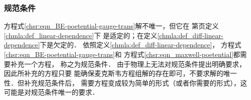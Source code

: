 \subsubsection{规范条件}
方程式\eqref{chsr:eqn_BE-poetential-gauge-trans}解不唯一，但它在
第\pageref{chmla:def_linear-dependence}页定义\ref{chmla:def_linear-dependence}下
是适定的；在定义\ref{chmla:def_diff-linear-dependence}下是欠定的．
依照定义\ref{chmla:def_diff-linear-dependence}，
方程式\eqref{chsr:eqn_BE-poetential-gauge-trans}和
方程式\eqref{chsr:eqn_maxwell-poetential}都需要补充一个方程，
称之为{\kaishu 规范条件}．
由于物理上无法对规范条件提出明确要求，因此所补充的方程只要
能确保麦克斯韦方程组解的存在即可，不要求解的唯一性．但补充规范条件后，
需要方程变成较为简单的形式（或者你需要的形式），这可能是对规范条件唯一的要求．


%
%
%
%
%
%

